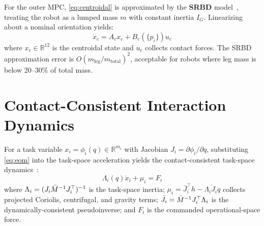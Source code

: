 For the outer MPC, \eqref{eq:centroidal} is approximated by the
\textbf{SRBD} model~\cite{dicarlo2018dynamic}, treating the robot as a
lumped mass $m$ with constant inertia $I_G$. Linearizing about a nominal
orientation yields:
\begin{equation}\label{eq:SRBD}
  \dot{x}_c = A_c x_c + B_c(\{p_i\})u_c
\end{equation}
where $x_c\in\mathbb{R}^{12}$ is the centroidal state and $u_c$ collects
contact forces. The SRBD approximation error is
$O(m_{\text{leg}}/m_{\text{total}})^2$, acceptable for robots where leg
mass is below 20--30\% of total mass.

\section{Contact-Consistent Interaction Dynamics}
\label{sec:osf}

For a task variable $x_i=\phi_i(q)\in\mathbb{R}^{m_i}$ with Jacobian
$J_i=\partial\phi_i/\partial q$, substituting \eqref{eq:eom} into the
task-space acceleration yields the contact-consistent task-space
dynamics~\cite{khatib1987unified,righetti2011inverse}:
\begin{equation}\label{eq:taskdyn}
  \Lambda_i(q)\ddot{x}_i + \mu_i = F_i
\end{equation}
where $\Lambda_i=(J_i\bar{M}^{-1} J_i^\top)^{-1}$ is the task-space inertia;
$\mu_i=\bar{J}_i^\top h - \Lambda_i\dot{J}_i\dot{q}$ collects projected
Coriolis, centrifugal, and gravity terms; $\bar{J}_i=\bar{M}^{-1} J_i^\top\Lambda_i$
is the dynamically-consistent pseudoinverse; and $F_i$ is the commanded
operational-space force.

